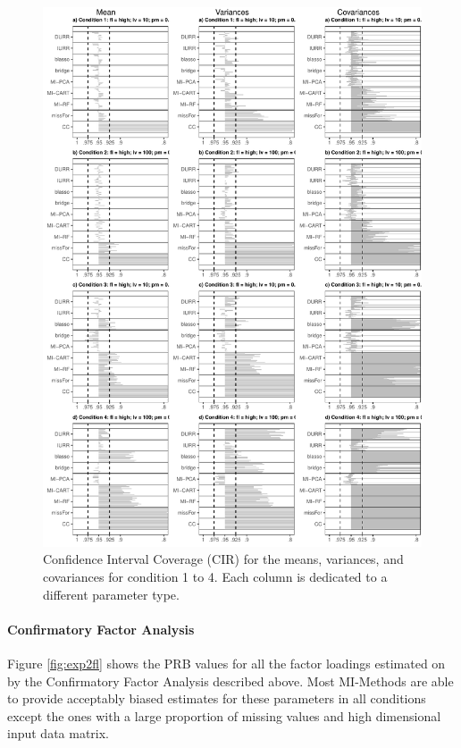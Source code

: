 \begin{figure}
	\includegraphics[width=\textwidth]{../../output/graphs/exp2_semR_ci_14.pdf}
\caption{Confidence Interval Coverage (CIR) for the means, variances, and covariances for condition 1 to 4.
	Each column is dedicated to a different parameter type.}
\label{fig:exp2cir}
\end{figure}

\FloatBarrier %

\paragraph{Confirmatory Factor Analysis}

	Figure \ref{fig:exp2fl} shows the PRB values for all the factor loadings estimated on by
	the Confirmatory Factor Analysis described above. 
	Most MI-Methods are able to provide acceptably biased estimates for these parameters in 
	all conditions except the ones with a large proportion of missing values and high 
	dimensional input data matrix.

